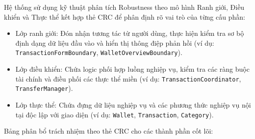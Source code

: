 \documentclass[a4paper,12pt]{report}
\providecommand{\tightlist}{%
  \setlength{\itemsep}{0pt}\setlength{\parskip}{0pt}}
\newcommand{\passthrough}[1]{#1}
\begin{document}
Hệ thống sử dụng kỹ thuật phân tích Robustness theo mô hình Ranh giới,
Điều khiển và Thực thể kết hợp thẻ CRC để phân định rõ vai trò của từng
cấu phần:

\begin{itemize}
\tightlist
\item
  Lớp ranh giới: Đón nhận tương tác từ người dùng, thực hiện kiểm tra sơ
  bộ định dạng dữ liệu đầu vào và hiển thị thông điệp phản hồi (ví dụ:
  \passthrough{\lstinline!TransactionFormBoundary!},
  \passthrough{\lstinline!WalletOverviewBoundary!}).
\item
  Lớp điều khiển: Chứa logic phối hợp luồng nghiệp vụ, kiểm tra các ràng
  buộc tài chính và điều phối các thực thể miền (ví dụ:
  \passthrough{\lstinline!TransactionCoordinator!},
  \passthrough{\lstinline!TransferManager!}).
\item
  Lớp thực thể: Chứa đựng dữ liệu nghiệp vụ và các phương thức nghiệp vụ
  nội tại độc lập với giao diện (ví dụ:
  \passthrough{\lstinline!Wallet!},
  \passthrough{\lstinline!Transaction!},
  \passthrough{\lstinline!Category!}).
\end{itemize}

Bảng phân bổ trách nhiệm theo thẻ CRC cho các thành phần cốt lõi:
\end{document}
